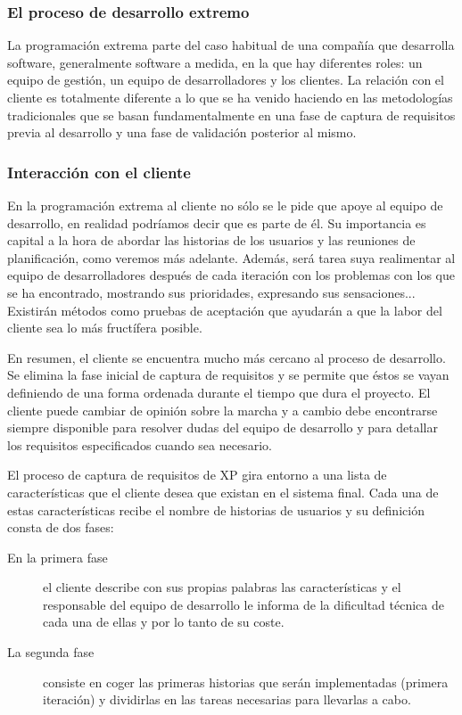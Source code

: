 \documentclass[12pt]{article} %
\begin{document}
		\subsubsection{El proceso de desarrollo extremo}
			La programación extrema parte del caso habitual de una compañía que desarrolla software, generalmente software a medida, en la que hay diferentes roles: un equipo de
			gestión, un equipo de desarrolladores y los clientes. La relación con el cliente es totalmente diferente a lo que se ha venido haciendo en las metodologías
			tradicionales que se basan fundamentalmente en una fase de captura de requisitos previa al desarrollo y una fase de validación posterior al mismo. 
		\subsubsection{Interacción con el cliente }
			En la programación extrema al cliente no sólo se le pide que apoye al equipo de desarrollo, en realidad podríamos decir que es parte de él. Su importancia es capital
			a la hora de abordar las historias de los usuarios y las reuniones de planificación, como veremos más adelante. Además, será tarea suya realimentar al equipo de
			desarrolladores después de cada iteración con los problemas con los que se ha encontrado, mostrando sus prioridades, expresando sus sensaciones... Existirán métodos
			como pruebas de aceptación que ayudarán a que la labor del cliente sea lo más fructífera posible.
			
			En resumen, el cliente se encuentra mucho más cercano al proceso de desarrollo. Se elimina la fase inicial de captura de requisitos y se permite que éstos se vayan
			definiendo de una forma ordenada durante el tiempo que dura el proyecto. El cliente puede cambiar de opinión sobre la marcha y a cambio debe encontrarse siempre
			disponible para resolver dudas del equipo de desarrollo y para detallar los requisitos especificados cuando sea necesario. 
			
			El proceso de captura de requisitos de XP gira entorno a una lista de características que el cliente desea que existan en el sistema final. Cada una de estas
			características recibe el nombre de historias de usuarios y su definición consta de dos fases:
			
			\begin{description}
				\item[En la primera fase] el cliente describe con sus propias palabras las características y el responsable del equipo de desarrollo le informa de la dificultad
				técnica de cada una de ellas y por lo tanto de su coste.
				\item[La segunda fase] consiste en coger las primeras historias que serán implementadas (primera iteración) y dividirlas en las tareas necesarias para llevarlas a
				cabo.
			\end{description}
			
\end{document}
